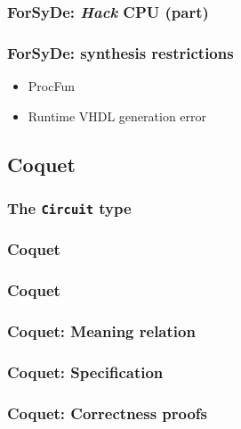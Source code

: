 \documentclass{beamer}
\begin{document}
            \begin{frame}
                \frametitle{ForSyDe: \emph{Hack} CPU (part)}
            \end{frame}

            \begin{frame}
                \frametitle{ForSyDe: synthesis restrictions}
                \begin{itemize}
                    \item ProcFun
                    \item Runtime VHDL generation error
                \end{itemize}
            \end{frame}


        \subsection{Coquet}
        \label{subsec:coquet}
            \begin{frame}
                \frametitle{The \texttt{Circuit} type}
            \end{frame}

            \begin{frame}
                \frametitle{Coquet}
            \end{frame}

            \begin{frame}
                \frametitle{Coquet}
            \end{frame}

            \begin{frame}
                \frametitle{Coquet: Meaning relation}
            \end{frame}

            \begin{frame}
                \frametitle{Coquet: Specification}
            \end{frame}

            \begin{frame}
                \frametitle{Coquet: Correctness proofs}
            \end{frame}
\end{document}
